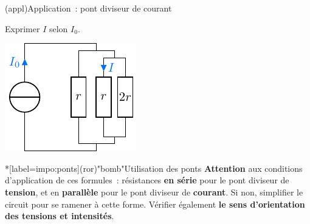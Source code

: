 \documentclass[../../main/main.tex]{subfiles}
\begin{document}
\begin{tcb}[breakable](appl){Application~: pont diviseur de courant}
	\vspace{-10pt}
	\begin{isd}[lefthand ratio=.3]
		Exprimer $I$ selon $I_0$.
		\begin{center}
			\includegraphics[scale=1]{divcour_last-plain}
		\end{center}
		\tcblower
		\begin{center}
		\end{center}
	\end{isd}
	\tcblower
	\begin{isd}
		\vspace{-15pt}
		\tcblower
	\end{isd}
\end{tcb}

\begin{tcb}*[label=impo:ponts](ror)"bomb"{Utilisation des
	ponts}
	\textbf{Attention} aux conditions d'application de ces formules~: résistances
	\textbf{en série} pour le pont diviseur de \textbf{tension}, et en
	\textbf{parallèle} pour le pont diviseur de \textbf{courant}.
	\smallbreak
	Si non, simplifier le circuit pour se ramener à cette forme. Vérifier
	également \textbf{le sens d'orientation des tensions et intensités}.
\end{tcb}
\vspace{-10pt}
\end{document}
